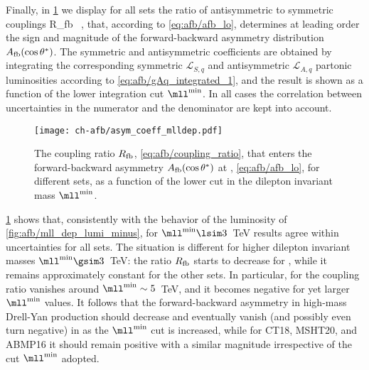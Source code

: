 Finally, in \cref{fig:afb/asym_coeff_mlldep} we display for all
\pdf sets the
ratio of antisymmetric to symmetric couplings
\be
\label{eq:afb/coupling_ratio}
R_{\rm fb}\equiv {} \, ,
\ee
that, according to
\cref{eq:afb/afb_lo}, determines at leading order
the sign and magnitude
of the forward-backward asymmetry distribution $A_{\rm fb}(\cos\theta^*)$.
%
The symmetric and antisymmetric coefficients are obtained by integrating
the corresponding symmetric $\mathcal{L}_{S,q}$ and antisymmetric
$\mathcal{L}_{A,q}$ partonic luminosities according to
\cref{eq:afb/gAq_integrated_1}, and the result is shown as a function of the lower integration cut $\mll^{\rm min}$.
%
In all cases the correlation between \pdf uncertainties in the numerator and
the denominator are kept into account.

\begin{figure}[!t]
 \centering
 \texttt{[image: ch-afb/asym\_coeff\_mlldep.pdf]}
 \caption{The coupling ratio $R_{\rm fb}$,
   \cref{eq:afb/coupling_ratio},
   that enters the forward-backward asymmetry $A_{\rm
     fb}(\cos\theta^*)$ at \lo,  \cref{eq:afb/afb_lo}, for different \pdf
   sets, as  a function of the lower cut in the dilepton
   invariant mass $\mll^{\rm min}$.
 }    
 \label{fig:afb/asym_coeff_mlldep}
\end{figure}

\cref{fig:afb/asym_coeff_mlldep} shows that, consistently
with the behavior of the luminosity of
\cref{fig:afb/mll_dep_lumi_minus},  for $\mll^{{\rm
    min}}\lsim 3$~TeV results agree within uncertainties for all \pdf
sets.
%
The situation is different for higher dilepton invariant masses $\mll^{{\rm min}}\gsim 3$~TeV:
the ratio $R_{\rm fb}$ starts to decrease for , while it
remains approximately  constant 
for the other  \pdf sets. In particular, for  the coupling ratio
vanishes around $\mll^{{\rm min}}\sim5$~TeV, and it becomes negative
for yet larger   $\mll^{{\rm min}}$ values.
It follows that the forward-backward
asymmetry in high-mass Drell-Yan production should decrease  and
eventually vanish (and possibly even turn negative)
in  as the $\mll^{{\rm min}}$ cut is increased,
while for CT18, MSHT20, and ABMP16 it should remain positive
with a similar magnitude irrespective of the cut  $\mll^{{\rm min}}$ adopted.

